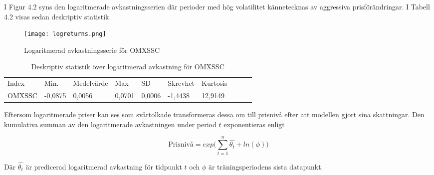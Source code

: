 \documentclass[11pt]{article}
\numberwithin{equation}{section}
\numberwithin{table}{section}
\numberwithin{figure}{section}
\begin{document}
\begin{table}[H]
\caption{Deskprivtiv statistik över stängningspriser för OMXSSC}
\end{table}

I Figur 4.2 syns den logaritmerade avkastningsserien där perioder med hög volatilitet kännetecknas av aggressiva prisförändringar. I Tabell 4.2 visas sedan deskriptiv statistik. 

\begin{figure}[H]
\caption{Logaritmerad avkastningsserie för OMXSSC}
\texttt{[image: logreturns.png]}
\centering
\end{figure}


\begin{table}[H]
\caption{Deskriptiv statistik över logaritmerad avkastning för OMXSSC}
\begin{tabular}{@{}llllllllll@{}}
\cmidrule(r){1-7}
%
Index  & Min.    & Medelvärde & Max    & SD     & Skrevhet & Kurtosis \\ \cmidrule(r){1-7}
OMXSSC & -0,0875 & 0,0056     & 0,0701 & 0,0006 & -1,4438  & 12,9149  \\ \cmidrule(r){1-7}
\end{tabular}
\end{table}



Eftersom logaritmerade priser kan ses som svårtolkade transformeras dessa om till prisnivå efter att modellen gjort sina skattningar. Den kumulativa summan av den logaritmerade avkastningen under period $t$ exponentieras enligt

\begin{equation}
    \text{Prisnivå} =  exp\Big({\sum\limits_{t=1}^n \hat{\theta_{t}}} + ln(\phi)\Big)
\end{equation}

Där  $\hat{\theta_t}$ är predicerad logaritmerad avkastning för tidpunkt $t$ och $\phi$ är träningsperiodens sista datapunkt. 


\end{document}
